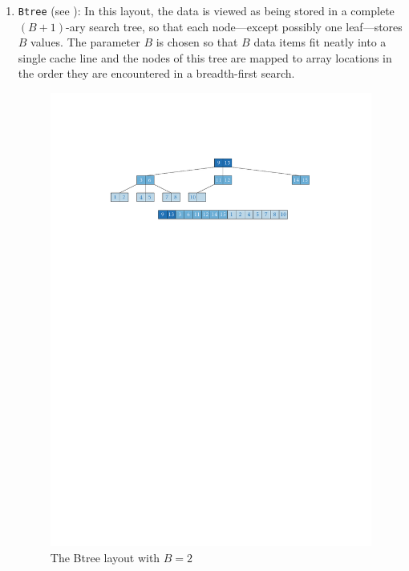 \documentclass{patmorin}
\begin{document}
\begin{enumerate}

  \item \texttt{Btree} (see ): In this layout, the data is
  viewed as being stored in a complete $(B+1)$-ary search tree, so that each
  node---except possibly one leaf---stores $B$ values.  The parameter
  $B$ is chosen so that $B$ data items fit neatly into a single cache line
  and the nodes of this tree are mapped to array locations in the order
  they are encountered in a breadth-first search.

  \begin{figure}
    \begin{center}\includegraphics{btree}\end{center}
    \caption{The Btree layout with $B=2$}
  \end{figure}


\end{enumerate}
\end{document}
